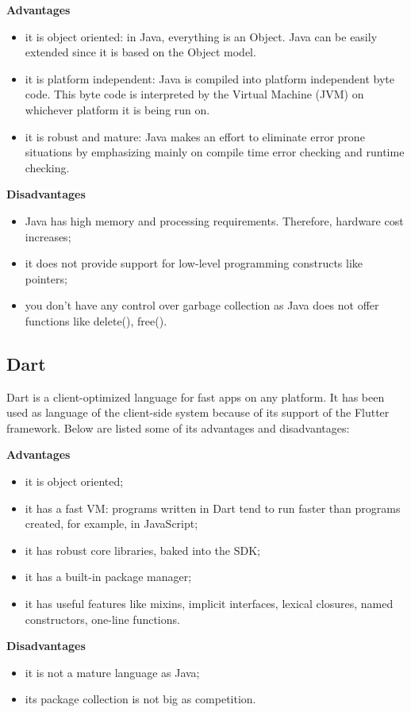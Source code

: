 \textbf{Advantages}
\begin{itemize}
	\item it is object oriented: in Java, everything is an Object. Java can be easily extended since it is based on the Object model.
	
	\item it is platform independent: Java is compiled into platform independent byte code. This byte code is interpreted by the Virtual Machine (JVM) on whichever platform it is being run on.
	
	\item it is robust and mature: Java makes an effort to eliminate error prone situations by emphasizing mainly on compile time error checking and runtime checking.
\end{itemize}

\textbf{Disadvantages}
\begin{itemize}
	\item Java has high memory and processing requirements. Therefore, hardware cost increases;
	\item it does not provide support for low-level programming constructs like pointers;
	\item you don't have any control over garbage collection as Java does not offer functions like delete(), free().	
\end{itemize}


\subsection{Dart}
Dart is a client-optimized language for fast apps on any platform. It has been used as language of the client-side system because of its support of the Flutter framework. Below are listed some of its advantages and disadvantages:

\textbf{Advantages}
\begin{itemize}
	\item it is object oriented;
	\item it has a fast VM: programs written in Dart tend to run faster than programs created, for example, in JavaScript;
	\item it has robust core libraries, baked into the SDK;
	\item it has a built-in package manager;
	\item it has useful features like mixins, implicit interfaces, lexical closures, named constructors, one-line functions.
\end{itemize}

\textbf{Disadvantages}
\begin{itemize}
	\item it is not a mature language as Java;
	\item its package collection is not big as competition.	
\end{itemize}
